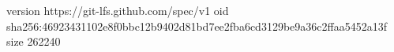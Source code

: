 version https://git-lfs.github.com/spec/v1
oid sha256:46923431102e8f0bbc12b9402d81bd7ee2fba6cd3129be9a36c2ffaa5452a13f
size 262240
